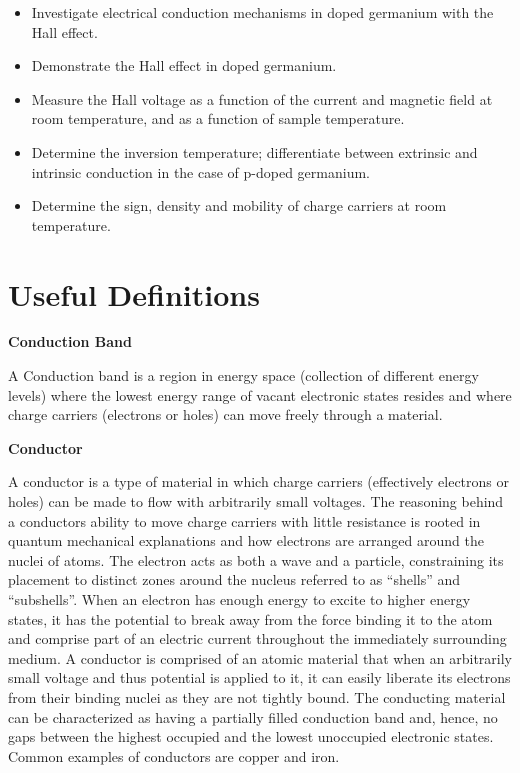 \documentclass{../lab}
\begin{document}
\begin{itemize}
    \item Investigate electrical conduction mechanisms in doped germanium with the Hall effect.

    \item Demonstrate the Hall effect in doped germanium.

    \item Measure the Hall voltage as a function of the current and magnetic field at room temperature, and as a function of sample temperature.

    \item Determine the inversion temperature; differentiate between extrinsic and intrinsic conduction in the case of p-doped germanium.

    \item Determine the sign, density and mobility of charge carriers at room temperature.

\end{itemize}

\section{Useful Definitions}

\textbf{Conduction Band}

A Conduction band is a region in energy space (collection of different energy levels) where the lowest energy range of vacant electronic states resides and where charge carriers (electrons or holes) can move freely through a material.

\textbf{Conductor}

A conductor is a type of material in which charge carriers (effectively electrons or holes) can be made to flow with arbitrarily small voltages. The reasoning behind a conductors ability to move charge carriers with little resistance is rooted in quantum mechanical explanations and how electrons are arranged around the nuclei of atoms. The electron acts as both a wave and a particle, constraining its placement to distinct zones around the nucleus referred to as ``shells'' and ``subshells''. When an electron has enough energy to excite to higher energy states, it has the potential to break away from the force binding it to the atom and comprise part of an electric current throughout the immediately surrounding medium. A conductor is comprised of an atomic material that when an arbitrarily small voltage and thus potential is applied to it, it can easily liberate its electrons from their binding nuclei as they are not tightly bound.  The conducting material can be characterized as having a partially filled conduction band and, hence, no gaps between the highest occupied and the lowest unoccupied electronic states. Common examples of conductors are copper and iron.
\end{document}
